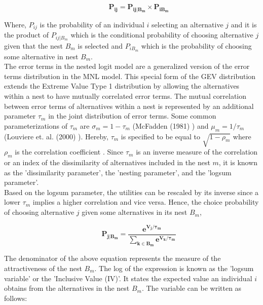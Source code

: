 \documentclass[a4paper,11pt]{article}
\begin{document}
    \begin{equation*}
        \qquad \mathbf{P_{ij} = P_{ij|B_{m}} \times P_{iB_{m}}}
    \end{equation*}

    Where, $P_{ij}$ is the probability of an individual $i$ selecting an alternative $j$ and it is the product of $P_{ij|B_{m}}$ which is the conditional probability of choosing alternative $j$ given that the nest $B_{m}$ is selected and $P_{iB_{m}}$ which is the probability of choosing some alternative in nest $B_{m}$.\\

    The error terms in the nested logit model are a generalized version of the error terms distribution in the MNL model. This special form of the GEV distribution extends the Extreme Value Type 1 distribution by allowing the alternatives within a nest to have mutually correlated error terms. The mutual correlation between error terms of alternatives within a nest is represented by an additional parameter $\tau_{m}$ in the joint distribution of error terms. Some common parameterizations of $\tau_{m}$ are $\sigma_{m} = 1 - \tau_{m}$ (McFadden (1981) \cite{McFadden}) and $\mu_{m} = 1/\tau_{m}$ (Louviere et. al. (2000) \cite{louviere2000stated}). Hereby, $\tau_{m}$ is specified to be equal to $\sqrt{1 - \rho_{m}}$ where $\rho_{m}$ is the correlation coefficient \cite{Heiss}. Since $\tau_{m}$ is an inverse measure of the correlation or an index of the dissimilarity of alternatives included in the nest $m$, it is known as the 'dissimilarity parameter', the 'nesting parameter', and the 'logsum parameter'. \\

    Based on the logsum parameter, the utilities can be rescaled by its inverse since a lower $\tau_{m}$ implies a higher correlation and vice versa. Hence, the choice probability of choosing alternative $j$  given some alternatives in its nest $B_{m}$,

    \begin{equation*}
        \qquad \mathbf{P_{j|B_{m}} = \dfrac{e^{V_{j}/\tau_{m}}} {\sum_{k \in B_{m}}e^{V_{k}/\tau_{m}}}}
    \end{equation*}

    \newpage
    The denominator of the above equation represents the measure of the attractiveness of the nest $B_{m}$. The log of the expression is known as the 'logsum variable' or the 'Inclusive Value (IV)'. It states the expected value an individual $i$ obtains from the alternatives in the nest $B_{m}$. The variable can be written as follows:
\end{document}
